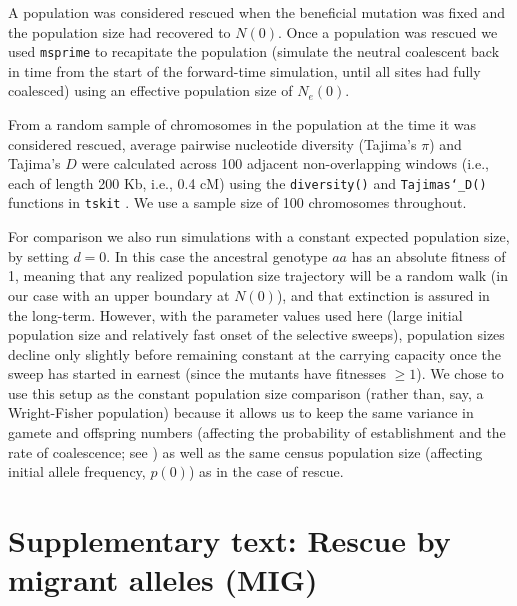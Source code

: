 \documentclass[]{article}
\begin{document}
A population was considered rescued when the beneficial mutation was fixed and the population size had recovered to $N(0)$.
Once a population was rescued we used \texttt{msprime} \citep{kelleher2016efficient} to recapitate the population (simulate the neutral coalescent back in time from the start of the forward-time simulation, until all sites had fully coalesced) using an effective population size of $N_e(0)$.

From a random sample of chromosomes in the population at the time it was considered rescued, average pairwise nucleotide diversity (Tajima's $\pi$) and Tajima's $D$ were calculated across 100 adjacent non-overlapping windows (i.e., each of length 200 Kb, i.e., 0.4 cM) using the \texttt{diversity()} and \texttt{Tajimas\char`_D()} functions in \texttt{tskit} \cite[][]{kelleher2018efficient}.
We use a sample size of 100 chromosomes throughout.
 
For comparison we also run simulations with a constant expected population size, by setting $d=0$.
In this case the ancestral genotype $aa$ has an absolute fitness of 1, meaning that any realized population size trajectory will be a random walk (in our case with an upper boundary at $N(0)$), and that extinction is assured in the long-term.  
However, with the parameter values used here (large initial population size and relatively fast onset of the selective sweeps), population sizes decline only slightly before remaining constant at the carrying capacity once the sweep has started in earnest (since the mutants have fitnesses $\geq 1$).
We chose to use this setup as the constant population size comparison (rather than, say, a Wright-Fisher population) because it allows us to keep the same variance in gamete and offspring numbers (affecting the probability of establishment and the rate of coalescence; see ) as well as the same census population size (affecting initial allele frequency, $p(0)$) as in the case of rescue.

\section*{Supplementary text: Rescue by migrant alleles (MIG)}
\label{sec:rescue_forward_mig}
\end{document}
